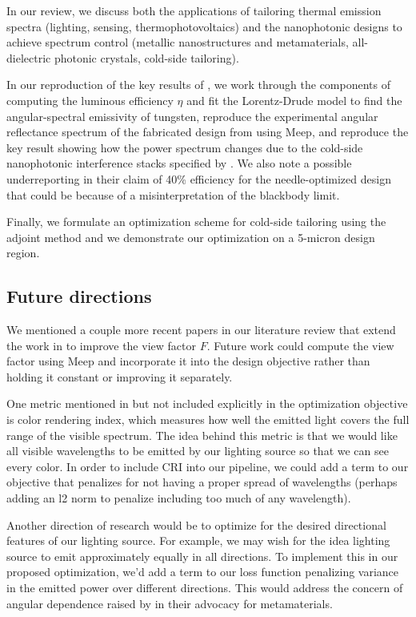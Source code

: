 \documentclass[%
 reprint,
 amsmath,amssymb,
 aps
]{revtex4-2}
\begin{document}
In our review, we discuss both the applications of tailoring thermal emission spectra (lighting, sensing, thermophotovoltaics) and the nanophotonic designs to achieve spectrum control (metallic nanostructures and metamaterials, all-dielectric photonic crystals, cold-side tailoring). 

In our reproduction of the key results of \cite{ilic}, we work through the components of computing the luminous efficiency $\eta$ and fit the Lorentz-Drude model to find the angular-spectral emissivity of tungsten, reproduce the experimental angular reflectance spectrum of the fabricated design from \cite{ilic} using Meep, and reproduce the key result showing how the power spectrum changes due to the cold-side nanophotonic interference stacks specified by \cite{ilic}. We also note a possible underreporting in their claim of 40\% efficiency for the needle-optimized design that could be because of a misinterpretation of the blackbody limit.

Finally, we formulate an optimization scheme for cold-side tailoring using the adjoint method and we demonstrate our optimization on a 5-micron design region. 

\subsection{Future directions}
We mentioned a couple more recent papers in our literature review that extend the work in \cite{ilic} to improve the view factor $F$. Future work could compute the view factor using Meep and incorporate it into the design objective rather than holding it constant or improving it separately. 

One metric mentioned in \cite{ilic} but not included explicitly in the optimization objective is color rendering index, which measures how well the emitted light covers the full range of the visible spectrum. The idea behind this metric is that we would like all visible wavelengths to be emitted by our lighting source so that we can see every color. In order to include CRI into our pipeline, we could add a term to our objective that penalizes for not having a proper spread of wavelengths (perhaps adding an l2 norm to penalize including too much of any wavelength).

Another direction of research would be to optimize for the desired directional features of our lighting source. For example, we may wish for the idea lighting source to emit approximately equally in all directions. To implement this in our proposed optimization, we'd add a term to our loss function penalizing variance in the emitted power over different directions. This would address the concern of angular dependence raised by \cite{topological} in their advocacy for metamaterials.
\end{document}
